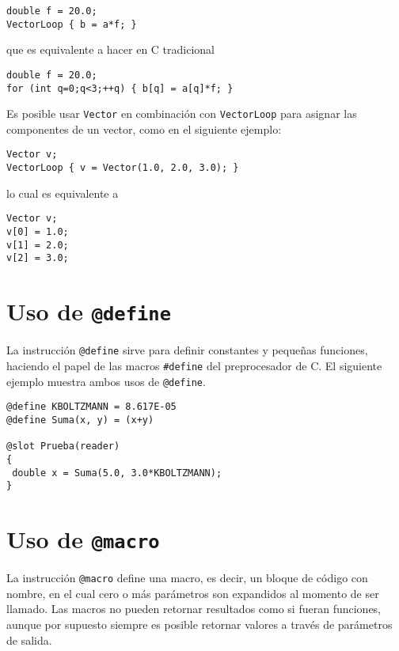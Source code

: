 \documentclass[a4paper,12pt]{article}
\begin{document}
\lstset{language=C}
\begin{lstlisting}
double f = 20.0;
VectorLoop { b = a*f; }
\end{lstlisting}
%
que es equivalente a hacer en C tradicional

\lstset{language=C}
\begin{lstlisting}
double f = 20.0;
for (int q=0;q<3;++q) { b[q] = a[q]*f; }
\end{lstlisting}

Es posible usar \verb'Vector' en combinaci\'on con \verb'VectorLoop' para
asignar las componentes de un vector, como en el siguiente ejemplo:

\lstset{language=C}
\begin{lstlisting}
Vector v;
VectorLoop { v = Vector(1.0, 2.0, 3.0); }
\end{lstlisting}
%
lo cual es equivalente a 

\lstset{language=C}
\begin{lstlisting}
Vector v;
v[0] = 1.0;
v[1] = 2.0;
v[2] = 3.0;
\end{lstlisting}

\section{Uso de \texttt{@define}}

La instrucci\'on \verb'@define' sirve para definir constantes y peque\~nas
funciones, haciendo el papel de las macros \verb'#define' del preprocesador de
C. El siguiente ejemplo muestra ambos usos de \verb'@define'.

\lstset{language=C}
\begin{lstlisting}
@define KBOLTZMANN = 8.617E-05
@define Suma(x, y) = (x+y)

@slot Prueba(reader)
{
 double x = Suma(5.0, 3.0*KBOLTZMANN);
}
\end{lstlisting}

\section{Uso de \texttt{@macro}}

La instrucci\'on \verb'@macro' define una macro, es decir, un bloque de c\'odigo
con nombre, en el cual cero o m\'as par\'ametros son expandidos al momento de
ser llamado. Las macros no pueden retornar resultados como si fueran funciones, 
aunque por supuesto siempre es posible retornar valores a trav\'es de
par\'ametros de salida.
\end{document}
